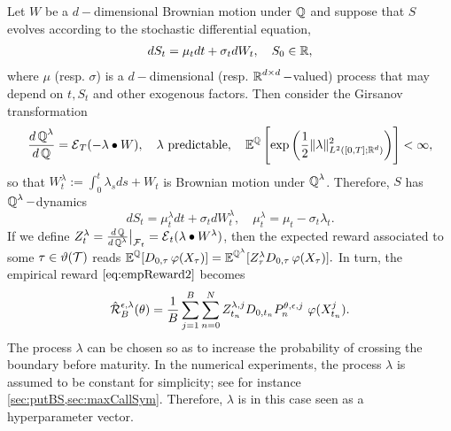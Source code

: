 Let $W$ be a $d-$dimensional Brownian motion under $\operatorname{\mathbb{Q}}$ and suppose that $S$ evolves according to the stochastic differential equation, 
\begin{align}\label{eq:stockSDE}
    dS_t = \mu_t dt + \sigma_t dW_t, \quad S_0 \in \operatorname{\mathbb{R}},
\end{align}
where $\mu$ (resp. $\sigma$) is a  $d-$dimensional  (resp. $\operatorname{\mathbb{R}}^{d\times d}-$valued) process that may depend on $t,S_t$ and other exogenous factors. 
Then consider the Girsanov transformation 
\begin{equation}\label{eq:Girsanov}
\frac{d\operatorname{\mathbb{Q}}^{\lambda}}{d\operatorname{\mathbb{Q}}} = \operatorname{\mathcal{E}}_T(- \lambda \bullet W), \quad \lambda  \text{ predictable},\quad   \operatorname{\mathbb{E}}^{\operatorname{\mathbb{Q}}}\left[\exp\left(\frac{1}{2}\lVert \lambda\rVert^2_{L^2([0,T];\operatorname{\mathbb{R}}^d)}\right)\right] <\infty, 
\end{equation}
so that 
$W_t^{\lambda} :=  \int_0^{t}\lambda_s ds + W_t$ is Brownian motion under $\operatorname{\mathbb{Q}}^{\lambda}$. Therefore, $S$ has $\operatorname{\mathbb{Q}}^{\lambda}-$dynamics
\begin{equation}
    dS_t = \mu^{\lambda}_t dt + \sigma_t dW^{\lambda}_t,\quad \mu^{\lambda}_t = \mu_t - \sigma_t \lambda_t. 
\end{equation}
If we define $Z^{\lambda}_t = \frac{d\operatorname{\mathbb{Q}}}{d\operatorname{\mathbb{Q}}^{\lambda}} \big |_{\operatorname{\mathcal{F}}_t}  = \operatorname{\mathcal{E}}_t(\lambda \bullet W^{\lambda})$, then the expected reward associated to some $\tau \in \vartheta(\operatorname{\mathcal{T}})$ reads  $\operatorname{\mathbb{E}}^{\operatorname{\mathbb{Q}}}[D_{0,\tau}\, \varphi(X_{\tau})] =  \operatorname{\mathbb{E}}^{\operatorname{\mathbb{Q}}^{\lambda}}[Z^{\lambda}_{\tau}D_{0,\tau}\, \varphi(X_{\tau})]. $ 
In turn, 
the empirical reward $\eqref{eq:empReward2}$ becomes 
\begin{equation}\label{eq:empReward3}
\hat{\operatorname{\mathcal{R}}}_B^{\epsilon,\lambda}(\theta) =  \frac{1}{B}\sum_{j=1}^B  \sum_{n=0}^N Z^{\lambda,j}_{t_n} D_{0,t_n}   P^{\theta,\epsilon,j}_{n}\ \varphi(X_{t_n}^j).
\end{equation}
The process $\lambda$ can be chosen so as to increase the probability of crossing the boundary before maturity. In the numerical experiments, the process $\lambda$ is assumed to be constant for simplicity; see for instance  \cref{sec:putBS,sec:maxCallSym}. Therefore, $\lambda$ is in this case seen as a hyperparameter vector. 